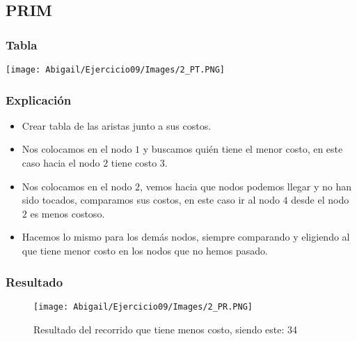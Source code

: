 \documentclass[12pt]{article}
\begin{document}
    \subsection{PRIM}
    \begin{multicols}{2}
            \subsubsection{Tabla}
                  \texttt{[image: Abigail/Ejercicio09/Images/2\_PT.PNG]}
              
        \columnbreak
        
            \subsubsection{Explicación}
                \begin{itemize}
        
                  \item[\checkmark] Crear tabla de las aristas junto a sus costos.
        
                  \item[\checkmark] Nos colocamos en el nodo $1$ y buscamos quién tiene el menor costo, en este caso hacia el nodo $2$ tiene costo $3$.
                  
                  \item[\checkmark] Nos colocamos en el nodo $2$, vemos hacia que nodos podemos llegar y no han sido tocados, comparamos sus costos, en este caso ir al nodo $4$ desde el nodo $2$ es menos costoso.
         
                  \item[\checkmark] Hacemos lo mismo para los demás nodos, siempre comparando y eligiendo al que tiene menor costo en los nodos que no hemos pasado.
        
                \end{itemize}
        \end{multicols}

      \subsubsection{Resultado}
        \begin{figure}[h!]
          \centering
          \texttt{[image: Abigail/Ejercicio09/Images/2\_PR.PNG]}
          \caption{Resultado del recorrido que tiene menos costo, siendo este: 34}
        \end{figure} 
\newpage
    
\end{document}
